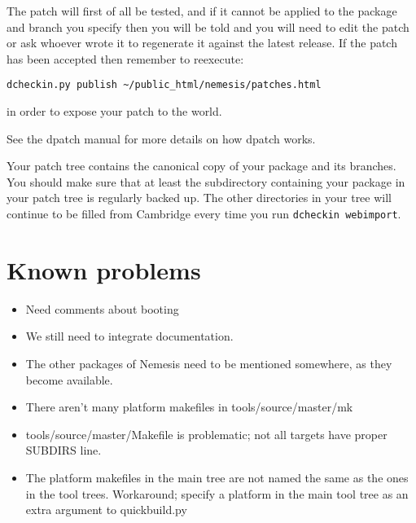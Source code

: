 \documentclass[a4paper]{article}
\newcommand{\cmd}[1]{\texttt{#1}}
\begin{document}
\begin{enumerate}
The patch will first of all be tested, and if it cannot be applied to
the package and branch you specify then you will be told and you will
need to edit the patch or ask whoever wrote it to regenerate it
against the latest release. If the patch has been accepted then
remember to reexecute:

\begin{verbatim}
dcheckin.py publish ~/public_html/nemesis/patches.html
\end{verbatim}

in order to expose your patch to the world.


\end{enumerate}

See the dpatch manual for more details on how dpatch works.

Your patch tree contains the canonical copy of your package and its
branches. You should make sure that at least the subdirectory
containing your package in your patch tree is regularly backed up. The
other directories in your tree will continue to be filled from
Cambridge every time you run \cmd{dcheckin webimport}.


\section{Known problems}

\begin{itemize}
\item Need comments about booting
\item We still need to integrate documentation.
\item The other packages of Nemesis need to be mentioned somewhere, as
they become available.
\item There aren't many platform makefiles in tools/source/master/mk
\item tools/source/master/Makefile is problematic; not all targets
have proper SUBDIRS line.
\item The platform makefiles in the main tree are not named the same
as the ones in the tool trees. Workaround; specify a platform in the
main tool tree as an extra argument to quickbuild.py
\end{itemize}
\end{document}
